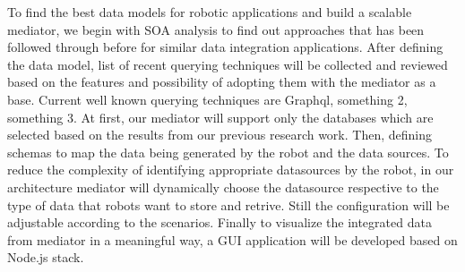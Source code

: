 To find the best data models for robotic applications and build a scalable mediator, we begin with SOA analysis to find out approaches that has been followed through before for similar data integration applications. After defining the data model, list of recent querying techniques will be collected and reviewed based on the features and possibility of adopting them with the mediator as a base. Current well known querying techniques are Graphql, something 2, something 3. At first, our mediator will support only the databases which are selected based on the results from our previous research work. Then, defining schemas to map the data being generated by the robot and the data sources. To reduce the complexity of identifying appropriate datasources by the robot, in our architecture mediator will dynamically choose the datasource respective to the type of data that robots want to store and retrive. Still the configuration will be adjustable according to the scenarios. Finally to visualize the integrated data from mediator in a meaningful way, a GUI application will be developed based on Node.js stack.
